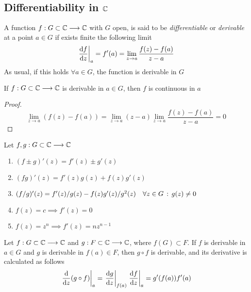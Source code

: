 \documentclass[../complete.tex]{subfiles}
\begin{document}
\subsection{Differentiability in $\mathbb{C}$}
\begin{dfn}[Differentiability]
	A function $f:G\subset\mathbb{C}\overset{}{\longrightarrow}\mathbb{C}$ with $G$ open, is said to be \textit{differentiable} or \textit{derivable} at a point $a\in G$ if exists finite the following limit
	\begin{equation}
		\derin[a]{\derivative{f}{z}}=f'(a)=\lim_{z\to a}\frac{f(z)-f(a)}{z-a}
		\label{eq:dercf}
	\end{equation}
	As usual, if this holds $\forall a\in G$, the function is derivable in $G$
\end{dfn}
\begin{thm}
	If $f:G\subset\mathbb{C}\overset{}{\longrightarrow}\mathbb{C}$ is derivable in $a\in G$, then $f$ is continuous in $a$
\end{thm}
\begin{proof}
	\begin{equation*}
		\lim_{z\to a}(f(z)-f(a))=\lim_{z\to a}(z-a)\lim_{z\to a}\frac{f(z)-f(a)}{z-a}=0
	\end{equation*}
\end{proof}
\begin{thm}
	Let $f,g:G\subset\mathbb{C}\overset{}{\longrightarrow}\mathbb{C}$
	\begin{enumerate}
	\item $(f\pm g)'(z)=f'(z)\pm g'(z)$
	\item $(fg)'(z)=f'(z)g(z)+f(z)g'(z)$
	\item $(f/g)'(z)=f'(z)/g(z)-f(z)g'(z)/g^2(z)\quad\forall z\in G\, :\,  g(z)\ne0$
	\item $f(z)=c\implies{} f'(z)=0$
	\item $f(z)=z^{n}\implies{} f'(z)=nz^{n-1}$
	\end{enumerate}
\end{thm}
\begin{thm}
	Let $f:G\subset\mathbb{C}\overset{}{\longrightarrow}\mathbb{C}$ and $g:F\subset\mathbb{C}\overset{}{\longrightarrow}\mathbb{C}$, where $f(G)\subset F$. If $f$ is derivable in $a\in G$ and $g$ is derivable in $f(a)\in F$, then $g\circ f$ is derivable, and its derivative is calculated as follows
	\begin{equation}
		\derin[a]{\derivative{z}(g\circ f)}=\derin[f(a)]{\derivative{g}{z}}\derin[a]{\derivative{f}{z}}=g'(f(a))f'(a)
		\label{eq:compositedercf}
	\end{equation}
\end{thm}
\end{document}
